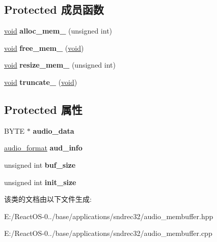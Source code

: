 \subsection*{Protected 成员函数}
\begin{DoxyCompactItemize}
\item 
\mbox{\label{classaudio__membuffer_aa6cb864d566493d48288a0afc6804a7d}} 
\hyperlink{interfacevoid}{void} {\bfseries alloc\+\_\+mem\+\_\+} (unsigned int)
\item 
\mbox{\label{classaudio__membuffer_a14fa6b2789213210374ccc7f3c56bd1d}} 
\hyperlink{interfacevoid}{void} {\bfseries free\+\_\+mem\+\_\+} (\hyperlink{interfacevoid}{void})
\item 
\mbox{\label{classaudio__membuffer_ac58d0b161f1e14cb0986b79d2568512c}} 
\hyperlink{interfacevoid}{void} {\bfseries resize\+\_\+mem\+\_\+} (unsigned int)
\item 
\mbox{\label{classaudio__membuffer_ae00295459abee9b2d1feff591d8b6d33}} 
\hyperlink{interfacevoid}{void} {\bfseries truncate\+\_\+} (\hyperlink{interfacevoid}{void})
\end{DoxyCompactItemize}
\subsection*{Protected 属性}
\begin{DoxyCompactItemize}
\item 
\mbox{\label{classaudio__membuffer_af437263b11f7f2f391f43c02d7b0f561}} 
B\+Y\+TE $\ast$ {\bfseries audio\+\_\+data}
\item 
\mbox{\label{classaudio__membuffer_ad721f2595840fffd416326629dac29f2}} 
\hyperlink{classaudio__format}{audio\+\_\+format} {\bfseries aud\+\_\+info}
\item 
\mbox{\label{classaudio__membuffer_a5263543b084f7b7c45a4e3455b4be513}} 
unsigned int {\bfseries buf\+\_\+size}
\item 
\mbox{\label{classaudio__membuffer_aba7c740e364923212a12176dd3a995b9}} 
unsigned int {\bfseries init\+\_\+size}
\end{DoxyCompactItemize}


该类的文档由以下文件生成\+:\begin{DoxyCompactItemize}
\item 
E\+:/\+React\+O\+S-\/0../base/applications/sndrec32/audio\+\_\+membuffer.\+hpp\item 
E\+:/\+React\+O\+S-\/0../base/applications/sndrec32/audio\+\_\+membuffer.\+cpp\end{DoxyCompactItemize}
